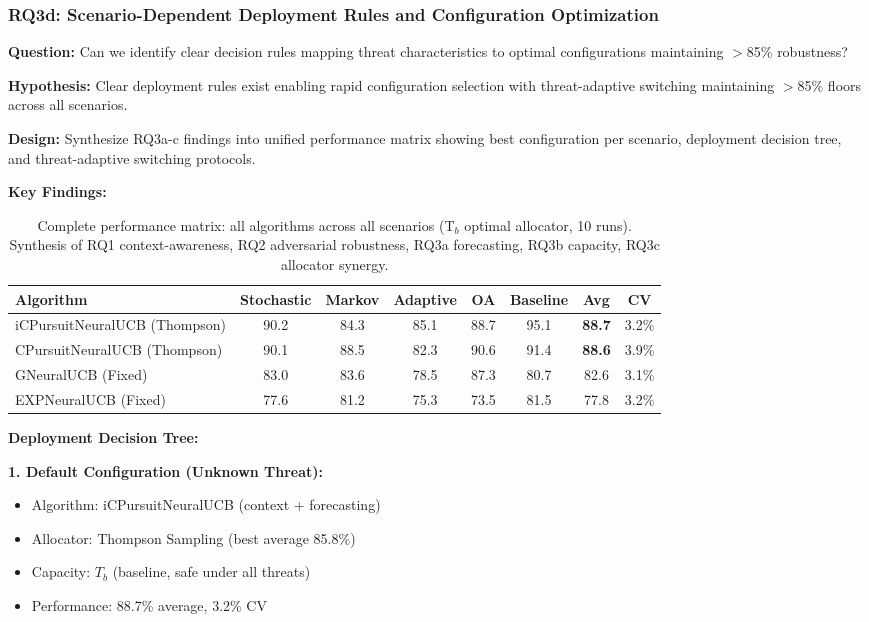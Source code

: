 
\subsubsection{RQ3d: Scenario-Dependent Deployment Rules and Configuration Optimization}

\noindent\textbf{Question:} Can we identify clear decision rules mapping threat characteristics to optimal configurations maintaining $>$85\% robustness?

\noindent\textbf{Hypothesis:} Clear deployment rules exist enabling rapid configuration selection with threat-adaptive switching maintaining $>$85\% floors across all scenarios.

\noindent\textbf{Design:} Synthesize RQ3a-c findings into unified performance matrix showing best configuration per scenario, deployment decision tree, and threat-adaptive switching protocols.

\noindent\textbf{Key Findings:}

\begin{table}[H]
\small
\centering
\caption{Complete performance matrix: all algorithms across all scenarios (T$_b$ optimal allocator, 10 runs). Synthesis of RQ1 context-awareness, RQ2 adversarial robustness, RQ3a forecasting, RQ3b capacity, RQ3c allocator synergy.}
\begin{tabular}{lccccccc}
\toprule
\textbf{Algorithm} & \textbf{Stochastic} & \textbf{Markov} & \textbf{Adaptive} & \textbf{OA} & \textbf{Baseline} & \textbf{Avg} & \textbf{CV} \\
\midrule
iCPursuitNeuralUCB (Thompson) & 90.2 & 84.3 & 85.1 & 88.7 & 95.1 & \textbf{88.7} & 3.2\% \\
CPursuitNeuralUCB (Thompson) & 90.1 & 88.5 & 82.3 & 90.6 & 91.4 & \textbf{88.6} & 3.9\% \\
GNeuralUCB (Fixed) & 83.0 & 83.6 & 78.5 & 87.3 & 80.7 & 82.6 & 3.1\% \\
EXPNeuralUCB (Fixed) & 77.6 & 81.2 & 75.3 & 73.5 & 81.5 & 77.8 & 3.2\% \\
\bottomrule
\end{tabular}
\label{tab:rq3d_matrix}
\end{table}

\noindent\textbf{Deployment Decision Tree:}

\noindent\textbf{1. Default Configuration (Unknown Threat):}
\begin{itemize}[nosep]
\item Algorithm: iCPursuitNeuralUCB (context + forecasting)
\item Allocator: Thompson Sampling (best average 85.8\%)
\item Capacity: $T_b$ (baseline, safe under all threats)
\item Performance: 88.7\% average, 3.2\% CV
\end{itemize}


